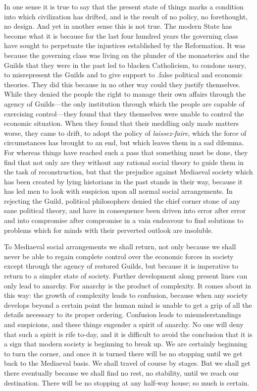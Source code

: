 \documentclass{book}
\begin{document}
In one sense it is true to say that the present state of things marks a condition into which civilization has drifted, and is the result of no policy, no forethought, no design. And yet in another sense this is not true. The modern State has become what it is because for the last four hundred years the governing class have sought to perpetuate the injustices established by the Reformation. It was because the governing class was living on the plunder of the monasteries and the Guilds that they were in the past led to blacken Catholicism, to condone usury, to misrepresent the Guilds and to give support to .false political and economic theories. They did this because in no other way could they justify themselves. While they denied the people the right to manage their own affairs through the agency of Guilds—the only institution through which the people are capable of exercising control—they found that they themselves were unable to control the economic situation. When they found that their meddling only made matters worse, they came to drift, to adopt the policy of \emph{laissez-faire}, which the force of circumstances has brought to an end, but which leaves them in a sad dilemma. For whereas things have reached such a pass that something must be done, they find that not only are they without any rational social theory to guide them in the task of reconstruction, but that the prejudice against Mediaeval society which has been created by lying historians in the past stands in their way, because it has led men to look with suspicion upon all normal social arrangements. In rejecting the Guild, political philosophers denied the chief corner stone of any sane political theory, and have in consequence been driven into error after error and into compromise after compromise in a vain endeavour to find solutions to problems which for minds with their perverted outlook are insoluble.

To Mediaeval social arrangements we shall return, not only because we shall never be able to regain complete control over the economic forces in society except through the agency of restored Guilds, but because it is imperative to return to a simpler state of society. Further development along present lines can only lead to anarchy. For anarchy is the product of complexity. It comes about in this way: the growth of complexity leads to confusion, because when any society develops beyond a certain point the human mind is unable to get a grip of all the details necessary to its proper ordering. Confusion leads to misunderstandings and suspicions, and these things engender a spirit of anarchy. No one will deny that such a spirit is rife to-day, and it is difficult to avoid the conclusion that it is a sign that modern society is beginning to break up. We are certainly beginning to turn the corner, and once it is turned there will be no stopping until we get back to the Mediaeval basis. We shall travel of course by stages. But we shall get there eventually because we shall find no rest, no stability, until we reach our destination. There will be no stopping at any half-way house; so much is certain.
\end{document}
